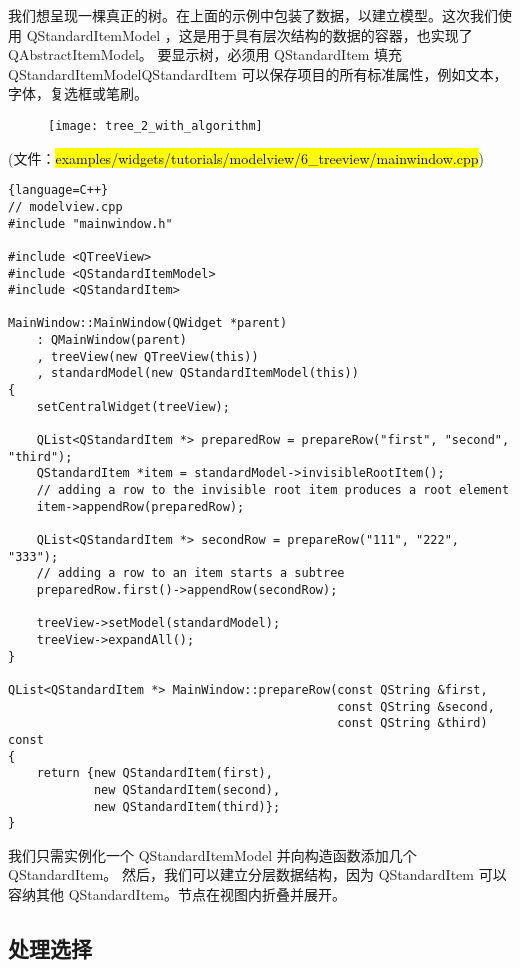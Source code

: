 我们想呈现一棵真正的树。在上面的示例中包装了数据，以建立模型。这次我们使用 QStandardItemModel ，这是用于具有层次结构的数据的容器，也实现了 QAbstractItemModel。
要显示树，必须用 QStandardItem 填充 QStandardItemModelQStandardItem 可以保存项目的所有标准属性，例如文本，字体，复选框或笔刷。

\begin{figure}[hbt!]  
\texttt{[image: tree\_2\_with\_algorithm]}
\end{figure}

(文件：\hl{examples/widgets/tutorials/modelview/6\_treeview/mainwindow.cpp})

\begin{lstlisting}{language=C++}
// modelview.cpp
#include "mainwindow.h"

#include <QTreeView>
#include <QStandardItemModel>
#include <QStandardItem>

MainWindow::MainWindow(QWidget *parent)
    : QMainWindow(parent)
    , treeView(new QTreeView(this))
    , standardModel(new QStandardItemModel(this))
{
    setCentralWidget(treeView);

    QList<QStandardItem *> preparedRow = prepareRow("first", "second", "third");
    QStandardItem *item = standardModel->invisibleRootItem();
    // adding a row to the invisible root item produces a root element
    item->appendRow(preparedRow);

    QList<QStandardItem *> secondRow = prepareRow("111", "222", "333");
    // adding a row to an item starts a subtree
    preparedRow.first()->appendRow(secondRow);

    treeView->setModel(standardModel);
    treeView->expandAll();
}

QList<QStandardItem *> MainWindow::prepareRow(const QString &first,
                                              const QString &second,
                                              const QString &third) const
{
    return {new QStandardItem(first),
            new QStandardItem(second),
            new QStandardItem(third)};
}
\end{lstlisting}

我们只需实例化一个 QStandardItemModel 并向构造函数添加几个 QStandardItem。
然后，我们可以建立分层数据结构，因为 QStandardItem 可以容纳其他 QStandardItem。节点在视图内折叠并展开。

\subsection{处理选择}


